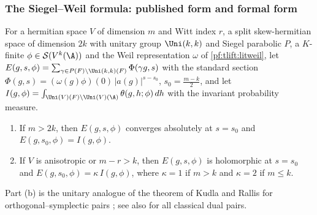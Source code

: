 \subsubsection*{The Siegel--Weil formula: published form and formal form}
For a hermitian space $V$ of dimension $m$ and Witt index $r$, a split skew-hermitian space of dimension $2k$ with
unitary group $\Uni(k,k)$ and Siegel parabolic $P$, a $K$-finite $\phi\in\tliftS(V^k(\A))$ and the Weil representation
$\omega$ of \cref{pf:tlift:litweil}, let $E(g,s,\phi)=\sum_{\gamma\in P(F)\backslash\Uni(k,k)(F)}\Phi(\gamma g,s)$ with the standard
section $\Phi(g,s)=(\omega(g)\phi)(0)\,|a(g)|^{s-s_0}$, $s_0=\frac{m-k}2$, and let
$I(g,\phi)=\int_{\Uni(V)(F)\backslash\Uni(V)(\A)}\theta(g,h;\phi)\,dh$ with the invariant probability measure.

\begin{littheorem}\label{pf:tlift:litsw}
\begin{enumerate}[label=(\alph*),nosep]
\item \cite{Weil1965} If $m>2k$, then $E(g,s,\phi)$ converges absolutely at $s=s_0$ and $E(g,s_0,\phi)=I(g,\phi)$.
\item \cite{Ichino2007} If $V$ is anisotropic or $m-r>k$, then $E(g,s,\phi)$ is holomorphic at $s=s_0$ and
  $E(g,s_0,\phi)=\kappa\,I(g,\phi)$, where $\kappa=1$ if $m>k$ and $\kappa=2$ if $m\le k$.
\end{enumerate}
\end{littheorem}

Part (b) is the unitary analogue of the theorem of Kudla and Rallis for orthogonal--symplectic pairs
\cite{KudlaRallis1988}; see also \cite{Yamana2014} for all classical dual pairs.

